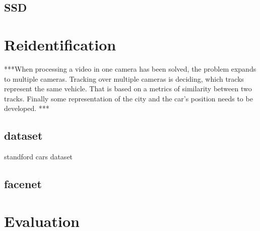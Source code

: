\documentclass[a4paper,12pt,titlepage, twoside]{article}
\numberwithin{figure}{section}
\begin{document}
\subsection{SSD}
\label{sec:ssd}

\section{Reidentification}


***When processing a video in one camera has been solved, the problem expands to multiple cameras. Tracking over multiple cameras is deciding, which tracks represent the same vehicle. That is based on a metrics of similarity between two tracks. Finally some representation of the city and the car's position needs to be developed.  ***

\subsection{dataset}
standford \cite{standford} cars dataset

\subsection{facenet}
\label{sec:facenet}


\section{Evaluation}






{}
\cleardoublepage
\clearpage
\end{document}
